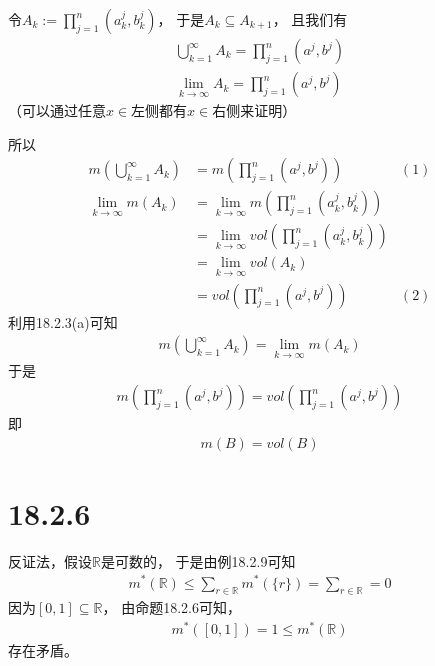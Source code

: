 \documentclass{article}
\begin{document}
令$A_k := \prod\limits_{j = 1}^n (a^j_k, b^j_k)$，
于是$A_k \subseteq A_{k + 1}$，
且我们有
\begin{align*}
  \bigcup\limits_{k = 1}^\infty A_k = \prod\limits_{j = 1}^n (a^j, b^j) \\
  \lim\limits_{k \to \infty} A_k = \prod\limits_{j = 1}^n (a^j, b^j)
\end{align*}
（可以通过任意$x \in \textbf{左侧}$都有$x \in \textbf{右侧}$来证明）

所以
\begin{align*}
  m(\bigcup\limits_{k = 1}^\infty A_k) & = m(\prod\limits_{j = 1}^n (a^j, b^j))                                  & (1) \\
  \lim\limits_{k \to \infty} m(A_k)    & = \lim\limits_{k \to \infty} m(\prod\limits_{j = 1}^n (a^j_k, b^j_k))         \\
                                       & = \lim\limits_{k \to \infty} vol(\prod\limits_{j = 1}^n (a^j_k, b^j_k))       \\
                                       & = \lim\limits_{k \to \infty} vol(A_k)                                         \\
                                       & = vol(\prod\limits_{j = 1}^n (a^j, b^j))                                & (2)
\end{align*}
利用18.2.3(a)可知
\begin{align*}
  m(\bigcup\limits_{k = 1}^\infty A_k) = \lim\limits_{k \to \infty} m(A_k)
\end{align*}
于是
\begin{align*}
  m(\prod\limits_{j = 1}^n (a^j, b^j)) = vol(\prod\limits_{j = 1}^n (a^j, b^j))  
\end{align*}
即
\begin{align*}
  m(B) = vol(B)
\end{align*}

\section*{18.2.6}

反证法，假设$\mathbb{R}$是可数的，
于是由例18.2.9可知
\begin{align*}
  m^{\ast}(\mathbb{R}) \leq \sum\limits_{r \in \mathbb{R}} m^{\ast}(\{r\}) = \sum\limits_{r \in \mathbb{R}} = 0 
\end{align*}
因为$[0, 1] \subseteq \mathbb{R}$，
由命题18.2.6可知，
\begin{align*}
  m^{\ast}([0, 1]) = 1 \leq m^{\ast}(\mathbb{R})
\end{align*}
存在矛盾。
\end{document}
